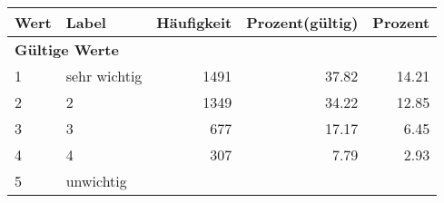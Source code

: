      \begin{longtable}{lXrrr}
     \toprule
     \textbf{Wert} & \textbf{Label} & \textbf{Häufigkeit} & \textbf{Prozent(gültig)} & \textbf{Prozent} \\
     \endhead
     \midrule
     \multicolumn{5}{l}{\textbf{Gültige Werte}}\\

     1 &
     \multicolumn{1}{X}{ sehr wichtig   } &


       \num{1491} &
       \num[round-mode=places,round-precision=2]{37.82} &
         \num[round-mode=places,round-precision=2]{14.21} \\

     2 &
     \multicolumn{1}{X}{ 2   } &


       \num{1349} &
       \num[round-mode=places,round-precision=2]{34.22} &
         \num[round-mode=places,round-precision=2]{12.85} \\

     3 &
     \multicolumn{1}{X}{ 3   } &


       \num{677} &
       \num[round-mode=places,round-precision=2]{17.17} &
         \num[round-mode=places,round-precision=2]{6.45} \\

     4 &
     \multicolumn{1}{X}{ 4   } &


       \num{307} &
       \num[round-mode=places,round-precision=2]{7.79} &
         \num[round-mode=places,round-precision=2]{2.93} \\

     5 &
     \multicolumn{1}{X}{ unwichtig   } &



\end{longtable}
